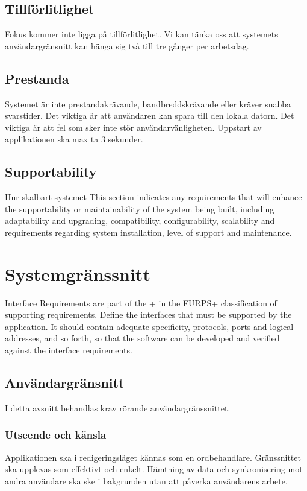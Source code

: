 \subsection{Tillförlitlighet} 
Fokus kommer inte ligga på tillförlitlighet. Vi kan tänka oss att systemets användargränsnitt kan hänga sig två till tre gånger per arbetsdag.

\subsection{Prestanda}
Systemet är inte prestandakrävande, bandbreddskrävande eller kräver snabba svarstider. Det viktiga är att användaren kan spara till den lokala datorn. Det viktiga är att fel som sker inte stör användarvänligheten. Uppstart av applikationen ska max ta 3 sekunder.

\subsection{Supportability}
Hur skalbart systemet This section indicates any requirements that will enhance the supportability or maintainability of the system being built, including adaptability and upgrading, compatibility, configurability, scalability and requirements regarding system installation, level of support and maintenance.

\section{Systemgränssnitt}

Interface Requirements are part of the + in the FURPS+ classification of supporting requirements. Define the interfaces that must be supported by the application. It should contain adequate specificity, protocols, ports and logical addresses, and so forth, so that the software can be developed and verified against the interface requirements.

\subsection{Användargränsnitt}

I detta avsnitt behandlas krav rörande användargränssnittet.

\subsubsection{Utseende och känsla}
Applikationen ska i redigeringsläget kännas som en ordbehandlare. Gränssnittet ska upplevas som effektivt och enkelt. Hämtning av data och synkronisering mot andra användare ska ske i bakgrunden utan att påverka användarens arbete.

